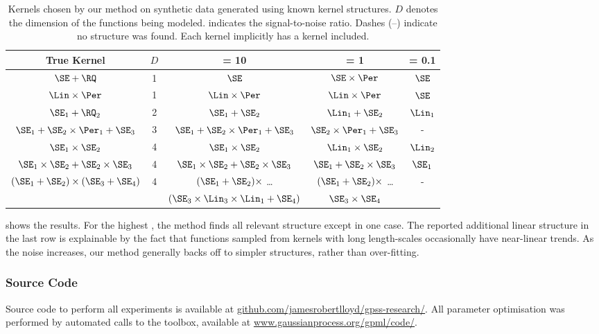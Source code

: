 \begin{table}[ht!]
\caption[Kernels recovered on synthetic data]
{
Kernels chosen by our method on synthetic data generated using known kernel structures. $D$ denotes the dimension of the functions being modeled.
\SNR{} indicates the signal-to-noise ratio.
Dashes (--) indicate no structure was found.
Each kernel implicitly has a \kWN{} kernel included.
}
\label{tbl:synthetic}
\begin{center}
{\small
\begin{tabular}{c c | c c c}
True Kernel & $D$ & \SNR{} = 10 & \SNR{} = 1 & \hspace{-1cm} \SNR{} = 0.1 \\
\hline
$\SE + \RQ$        & 1 & $\SE$ & $\SE \times \Per$ & $\SE$ \\
$\Lin \times \Per$ & 1 & $\Lin \times \Per$ & $\Lin \times \Per$ & $\SE$ \\
$\SE_1 + \RQ_2$    & 2 & $\SE_1 + \SE_2$ & $\Lin_1 + \SE_2$ & $\Lin_1$ \\
$\SE_1 + \SE_2 \times \Per_1 + \SE_3$ & 3 & $\SE_1 + \SE_2 \times \Per_1 + \SE_3$ & $\SE_2 \times \Per_1 + \SE_3$ & - \\
$\SE_1 \times \SE_2$ & 4 & $\SE_1 \times \SE_2$ & $\Lin_1 \times \SE_2$ & $\Lin_2$ \\
$\SE_1 \times \SE_2 + \SE_2 \times \SE_3$ & 4 & $\SE_1 \times \SE_2 + \SE_2 \times \SE_3$ & $\SE_1 + \SE_2 \times \SE_3$ & $\SE_1$ \\
\multirow{2}{*}{ $(\SE_1 + \SE_2) \times (\SE_3 + \SE_4)$ } & \multirow{2}{*}{4} & $(\SE_1 + \SE_2) \times$ \dots & $(\SE_1 + \SE_2) \times$ \dots & \multirow{2}{*}{-} \\
 & & $(\SE_3\times\Lin_3\times\Lin_1 + \SE_4)$ & $\SE_3 \times \SE_4$ &
\end{tabular}
}
\end{center}
\end{table}


 shows the results.
For the highest \SNR{}, the method finds all relevant structure except in one case.
The reported additional linear structure in the last row is explainable by the fact that functions sampled from \kSE{} kernels with long length-scales occasionally have near-linear trends.
As the noise increases, our method generally backs off to simpler structures, rather than over-fitting.

\subsubsection{Source Code}
Source code to perform all experiments is available at \url{github.com/jamesrobertlloyd/gpss-research/}. 
All \gp{} parameter optimisation was performed by automated calls to the \GPML{} toolbox, available at \url{www.gaussianprocess.org/gpml/code/}.


